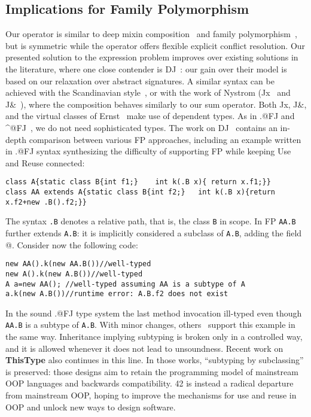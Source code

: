 \subsection{Implications for Family
Polymorphism}
\saveSpace
Our \Q@Use@ operator is similar to deep mixin
composition~\cite{ernst99a,Zenger-Odersky2005, Hutchins06}
and family polymorphism~\cite{Ernst06, igarashi2005lightweight,
IgarashiViroli07, IgarashiEtAl08}, but is symmetric while the operator
\Q@super@ offers flexible  explicit conflict resolution.
Our presented solution to the expression problem improves over existing solutions in the literature, where one close contender is DJ~\cite{deep}: our gain over their model is based on our relaxation over abstract signatures.
A similar syntax can be achieved with the Scandinavian style~\cite{ernst2004expression}, or with the work of 
Nystrom (Jx~\cite{NystromEtAl04} and
J\&~\cite{nystrom2006j}), where the composition behaves similarly to our sum operator.
Both Jx, J\&, and the virtual classes of Ernst~\cite{Ernst06}
make use of dependent types.
As in \Q@.@FJ and \Q@^@FJ~\cite{igarashi2005lightweight,IgarashiEtAl08,IgarashiViroli07,saito2008essence},
 we do not need sophisticated types. 
The work on DJ~\cite{deep} contains an in-depth comparison between various FP approaches, including an example written in \Q@.@FJ syntax synthesizing the difficulty of supporting FP while keeping Use and Reuse connected:
\saveSpace\saveSpace
\begin{lstlisting}
class A{static class B{int f1;}    int k(.B x){ return x.f1;}}
class AA extends A{static class B{int f2;}   int k(.B x){return x.f2+new .B().f2;}}
\end{lstlisting}\saveSpace\saveSpace
The syntax \lstinline{.B} denotes a relative path, that is, the 
class \lstinline{B} in scope.
In FP \lstinline{AA.B} further extends \lstinline{A.B}: it is implicitly considered a subclass of \lstinline{A.B}, adding the field @.
Consider now the following code:
\saveSpace\saveSpace\begin{lstlisting}
new AA().k(new AA.B())//well-typed
new A().k(new A.B())//well-typed
A a=new AA(); //well-typed assuming AA is a subtype of A
a.k(new A.B())//runtime error: A.B.f2 does not exist
\end{lstlisting}\saveSpace\saveSpace
In the sound \Q@.@FJ type system the last method invocation ill-typed even though \lstinline{AA.B} is a subtype of \lstinline{A.B}.
With minor changes, others~\cite{nystrom2006j,Ernst06,BruceEtAl98,IgarashiViroli07}
support this example in the same way.
Inheritance implying subtyping is broken only in a controlled way, and it is allowed whenever it does not lead to unsoundness.
Recent work on {\bf ThisType} \cite{Saito:2009,ryu16ThisType}
also continues in this line.
In those works, ``subtyping by subclassing'' is preserved: those designs aim to retain the programming model of mainstream OOP languages and backwards compatibility. 42 is instead a radical departure from mainstream OOP, hoping to improve the mechanisms for use and reuse in OOP and unlock new ways to design software.

